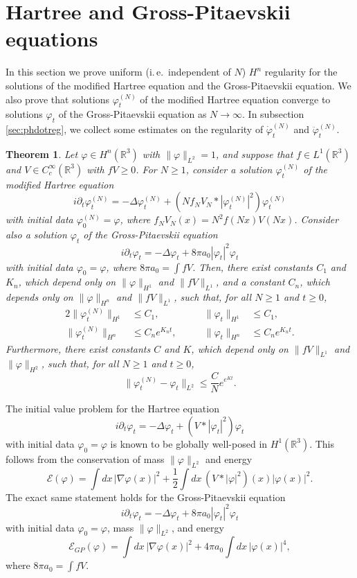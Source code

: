 \documentclass[11pt,a4paper,draft,DIV11]{scrartcl}	%
\newtheorem{thm}{Theorem}[section]
\newcommand{\R}{\mathds{R}}
\newcommand{\ph}{\varphi_t^{(N)}}	%
\newcommand{\phdot}{\dot{\varphi}_t^{(N)}}	%
\newcommand{\phddot}{\ddot{\varphi}_t^{(N)}}	%
\begin{document}
\section{Hartree and Gross-Pitaevskii equations}
In this section we prove uniform (i.\,e.\ independent of $N$) $H^n$
regularity for the solutions of the modified Hartree equation and the
Gross-Pitaevskii equation. We also prove that solutions $\varphi_t^{(N)}$ of
the modified Hartree equation converge to solutions $\varphi_t$ of the
Gross-Pitaevskii equation as $N \to \infty$. In subsection
\ref{sec:phdotreg}, we collect some estimates on the regularity of $\phdot$
and $\phddot$.

\begin{thm} \label{t:pdes}%
  Let $\varphi \in H^n(\R^3)$ with $\| \varphi \|_{L^2} = 1$, and suppose that
  $f \in L^1(\R^3)$ and $V \in C_c^\infty(\R^3)$ with $fV \ge 0$. For $N \ge
  1$, consider a solution $\ph$ of the modified Hartree equation
  \[
    i \partial_t \varphi_t^{(N)} = - \Delta \varphi_t^{(N)} + (N f_N V_N *
    |\varphi_t^{(N)}|^2) \varphi_t^{(N)}
  \]
  with initial data $\varphi^{(N)}_0 = \varphi$, where $f_N V_N(x) = N^2
  f(Nx)V(Nx)$. Consider also a solution $\varphi_t$ of the Gross-Pitaevskii equation
  \[
    i \partial_t \varphi_t = - \Delta \varphi_t + 8 \pi a_0 |\varphi_t|^2
    \varphi_t
  \]
  with initial data $\varphi_0 = \varphi$, where $8 \pi a_0 = \int f V$.
  Then, there exist constants $C_1$ and $K_n$, which depend only on $\|
  \varphi \|_{H^1}$ and $\| fV \|_{L^1}$, and a constant $C_n$, which
  depends only on $\| \varphi \|_{H^n}$ and $\| fV \|_{L^1}$, such that, for
  all $N \ge 1$ and $t \ge 0$,
  \begin{alignat}{2}
    \| \varphi_t^{(N)} \|_{H^1} & \le C_1, & \qquad \| \varphi_t \|_{H^1} &
    \le C_1, \tag{i} \label{H1} \\
    \| \varphi_t^{(N)} \|_{H^n} & \le C_n e^{K_n t}, & \qquad \| \varphi_t
    \|_{H^n} & \le C_n e^{K_n t}. \tag{ii}
  \end{alignat}
 Furthermore, there exist constants $C$ and $K$, which depend only on $\| fV
 \|_{L^1}$ and $\| \varphi \|_{H^2}$, such that, for all $N \geq 1$
 and $t \geq 0$,
  \begin{equation}
    \| \varphi_t^{(N)} - \varphi_t \|_{L^2} \le \frac{C}{N} e^{e^{K t}}.
    \tag{iii}
  \end{equation}
\end{thm}


The initial value problem for the Hartree equation
\[
  i \partial_t \varphi_t = - \Delta \varphi_t + (V * |\varphi_t|^2)
  \varphi_t
\]
with initial data $\varphi_0 = \varphi$ is known to be globally well-posed
in $H^1(\R^3)$. This follows from the conservation of mass $\| \varphi
\|_{L^2}$ and energy
\[
  \mathcal{E}(\varphi) = \int dx \, |\nabla \varphi(x)|^2 + \frac{1}{2} \int
  dx \, (V * |\varphi|^2)(x) |\varphi(x)|^2.
\]
The exact same statement holds for the Gross-Pitaevskii equation
\[
  i \partial_t \varphi_t = - \Delta \varphi_t + 8 \pi a_0 |\varphi_t|^2
  \varphi_t
\]
with initial data $\varphi_0 = \varphi$, mass $\| \varphi \|_{L^2}$, and
energy
\[
  \mathcal{E}_{GP}(\varphi) = \int dx \, |\nabla \varphi(x)|^2 + 4 \pi a_0
  \int dx \, |\varphi(x)|^4,
\]
where $8 \pi a_0 = \int f V$.
\end{document}
